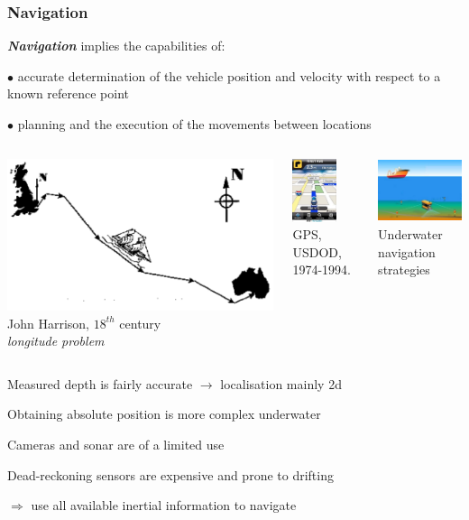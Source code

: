 \begin{frame} \frametitle{Navigation}
\vspace{-10pt}
\textit{\textbf{Navigation}} implies the capabilities of:

{\footnotesize $\bullet$ accurate determination of the vehicle position and velocity with respect to a known reference point}

{\footnotesize $\bullet$ planning and the execution of the movements between locations}
\vspace{5pt}
\begin{columns}
\centering
\includegraphics[width=0.8\linewidth]{fig/map.pdf} \\
{\scriptsize John Harrison, $18^{th}$ century \\
\textit{longitude problem} }


\centering
\includegraphics[height=5em]{fig/phone-navigation.pdf} \\
{\scriptsize GPS, USDOD, 1974-1994. }

\centering
\includegraphics[height=5em]{fig/rov-navigation.pdf} \\
{\scriptsize  Underwater navigation strategies }
\end{columns} 
\vspace{5pt}
\hspace{0.5cm} \pro Measured depth is fairly accurate $\rightarrow$ localisation mainly 2d

\hspace{0.5cm} \contra Obtaining absolute position is more complex underwater

\hspace{0.5cm} \contra Cameras and sonar are of a limited use

\hspace{0.5cm} \contra Dead-reckoning sensors are expensive and prone to drifting

{\centering 
$\Longrightarrow$ use all available inertial information to navigate
}
\end{frame}